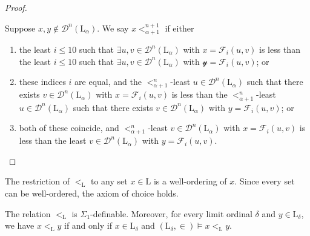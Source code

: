 \begin{proof}
\begin{enumerate}
        Suppose \( x, y \notin \mathcal D^n(\mathrm{L}_\alpha) \).
        We say \( x <_{\alpha + 1}^{n+1} \) if either
        \begin{enumerate}
            \item the least \( i \leq 10 \) such that \( \exists u, v \in \mathcal D^n(\mathrm{L}_\alpha) \) with \( x = \mathcal F_i(u, v) \) is less than the least \( i \leq 10 \) such that \( \exists u, v \in \mathcal D^n(\mathrm{L}_\alpha) \) with \( \mathcal y = \mathcal F_i(u, v) \); or
            \item these indices \( i \) are equal, and the \( <_{\alpha + 1}^n \)-least \( u \in \mathcal D^n(\mathrm{L}_\alpha) \) such that there exists \( v \in \mathcal D^n(\mathrm{L}_\alpha) \) with \( x = \mathcal F_i(u, v) \) is less than the \( <_{\alpha + 1}^n \)-least \( u \in \mathcal D^n(\mathrm{L}_\alpha) \) such that there exists \( v \in \mathcal D^n(\mathrm{L}_\alpha) \) with \( y = \mathcal F_i(u, v) \); or
            \item both of these coincide, and \( <_{\alpha + 1}^n \)-least \( v \in \mathcal D^n(\mathrm{L}_\alpha) \) with \( x = \mathcal F_i(u, v) \) is less than the least \( v \in \mathcal D^n(\mathrm{L}_\alpha) \) with \( y = \mathcal F_i(u, v) \).
        \end{enumerate}
    \end{enumerate}
\end{proof}
The restriction of \( <_{\mathrm{L}} \) to any set \( x \in \mathrm{L} \) is a well-ordering of \( x \).
Since every set can be well-ordered, the axiom of choice holds.
\begin{lemma}
    The relation \( <_{\mathrm{L}} \) is \( \Sigma_1 \)-definable.
    Moreover, for every limit ordinal \( \delta \) and \( y \in \mathrm{L}_\delta \), we have \( x <_{\mathrm{L}} y \) if and only if \( x \in \mathrm{L}_\delta \) and \( (\mathrm{L}_\delta, \in) \vDash x <_{\mathrm{L}} y \).
\end{lemma}

